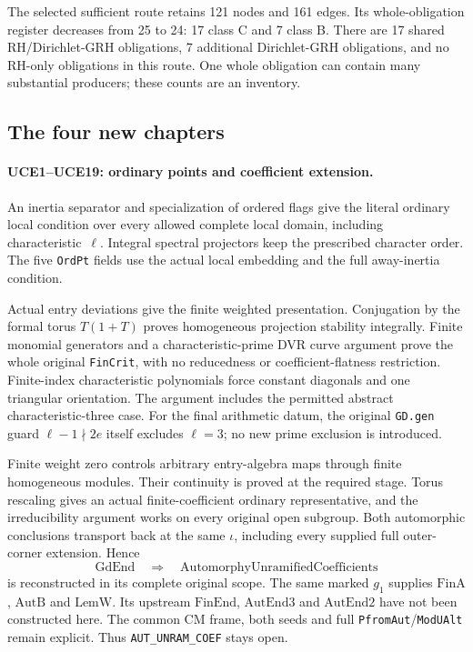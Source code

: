 \documentclass[11pt,a4paper]{article}
\numberwithin{equation}{section}
\theoremstyle{remark}\newtheorem{remark}[theorem]{Remark}
\begin{document}
The selected sufficient route retains 121 nodes and 161 edges.
Its whole-obligation register decreases from 25 to 24:
17 class C and 7 class B. There are 17 shared RH/Dirichlet-GRH
obligations, 7 additional Dirichlet-GRH obligations, and no
RH-only obligations in this route. One whole obligation can contain
many substantial producers; these counts are an inventory.

\subsection{The four new chapters}

\paragraph{UCE1--UCE19: ordinary points and coefficient extension.}
An inertia separator and specialization of ordered flags give the
literal ordinary local condition over every allowed complete local
domain, including characteristic~\(\ell\). Integral spectral
projectors keep the prescribed character order. The five
\texttt{Ord\allowbreak Pt} fields use the actual local embedding and the full
away-inertia condition.

Actual entry deviations give the finite weighted presentation.
Conjugation by the formal torus \(T(1+T)\) proves homogeneous
projection stability integrally. Finite monomial generators and a
characteristic-prime DVR curve argument prove the whole original
\texttt{Fin\allowbreak Crit}, with no reducedness or coefficient-flatness
restriction. Finite-index characteristic polynomials force constant
diagonals and one triangular orientation. The argument includes
the permitted abstract characteristic-three case. For the final
arithmetic datum, the original \texttt{GD.\allowbreak gen} guard
\(\ell-1\nmid 2e\) itself excludes \(\ell=3\); no new
prime exclusion is introduced.

Finite weight zero controls arbitrary entry-algebra maps through
finite homogeneous modules. Their continuity is proved at the
required stage. Torus rescaling gives an actual finite-coefficient
ordinary representative, and the irreducibility argument works on
every original open subgroup. Both automorphic conclusions transport
back at the same \(\iota\), including every supplied full
outer-corner extension. Hence
\[
 \mathrm{GdEnd}\quad\Longrightarrow\quad
 \mathrm{AutomorphyUnramifiedCoefficients}
\]
is reconstructed in its complete original scope. The same marked
\(g_1\) supplies \(\mathrm{FinA}\), \(\mathrm{AutB}\) and
\(\mathrm{LemW}\). Its upstream \(\mathrm{FinEnd}\),
\(\mathrm{AutEnd3}\) and \(\mathrm{AutEnd2}\) have not been
constructed here. The common CM frame, both seeds and full
\texttt{Pfrom\allowbreak Aut}/\texttt{Mod\allowbreak UAlt} remain explicit.
Thus \texttt{AUT\_\allowbreak UNRAM\_\allowbreak COEF} stays open.
\end{document}
